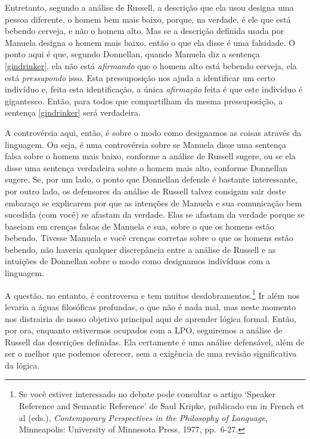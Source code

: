 Entretanto, segundo a análise de Russell, a descrição que ela usou designa uma pessoa diferente, o homem bem mais baixo, porque, na verdade, é ele que está bebendo cerveja, e não o homem alto.
Mas se a descrição definida usada por Manuela designa o homem mais baixo, então o que ela disse é uma falsidade.
O ponto aqui é que, segundo Donnellan, quando Manuela diz a sentença \ref{gindrinker}, ela não está \emph{afirmando} que o homem alto está bebendo cerveja, ela está \emph{pressupondo} isso.
Esta pressuposição nos ajuda a identificar um certo indivíduo e, feita esta identificação, a única \emph{afirmação} feita é que este indivíduo é gigantesco.
Então, para todos que compartilham da mesma pressuposição, a sentença \ref{gindrinker} será verdadeira.

A controvérsia aqui, então, é sobre o modo como designamos as coisas através da linguagem.
Ou seja, é uma controvérsia sobre se Manuela disse uma sentença falsa sobre o homem mais baixo, conforme a análise de Russell sugere, ou se ela disse uma sentença verdadeira sobre o homem mais alto, conforme Donnellan sugere.
Se, por um lado, o ponto que Donnellan defende é bastante interessante, por outro lado, os defensores da análise de Russell talvez consigam sair deste embaraço se explicarem por que as intenções de Manuela e sua comunicação bem sucedida (com você) se afastam da verdade.
Elas se afastam da verdade porque se baseiam em crenças falsas de Manuela e sua, sobre o que os homens estão bebendo.
Tivesse Manuela e você crenças corretas sobre o que os homens estão bebendo, não haveria qualquer discrepância entre a análise de Russell e as intuições de Donnellan sobre o modo como designamos indivíduos com a linguagem.

A questão, no entanto, é controversa e tem muitos desdobramentos.\footnote{
	Se você estiver interessado no debate pode consultar o artigo `Speaker Reference and Semantic Reference' de Saul Kripke, publicado em  in French et al (eds.), \emph{Contemporary Perspectives in the Philosophy of Language}, Minneapolis: University of Minnesota Press, 1977, pp.\ 6-27.}
Ir além nos levaria a águas filosóficas profundas, o que não é nada mal, mas neste momento nos distrairia de nosso objetivo principal aqui de aprender lógica formal.
Então, por ora, enquanto estivermos ocupados com a LPO, seguiremos a análise de Russell das descrições definidas.
Ela certamente é uma análise defensável, além de ser o melhor que podemos oferecer, sem a exigência de uma revisão significativa da lógica.

 
\practiceproblems

